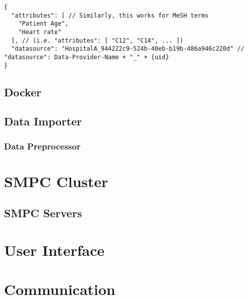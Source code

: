 {
\begin{verbatim}
{
  "attributes": [ // Similarly, this works for MeSH terms
    "Patient Age",
    "Heart rate"
  ], // (i.e. "attributes": [ "C12", "C14", ... ])
  "datasource": "HospitalA_944222c9-524b-40eb-b19b-486a946c220d" // "datasource": Data-Provider-Name + "_" + {uid}
}
\end{verbatim}
\label{sc:smpc-import-post}
}


\subsection{Docker}\label{ss:data-providers-docker}


\subsection{Data Importer}\label{ss:data-providers-importer}


\subsubsection{Data Preprocessor}\label{sss:data-providers-preprocessor}



\section{SMPC Cluster}\label{s:impl-smpc-cluster}

\subsection{SMPC Servers}\label{ss:smpc-cluster-servers}



\section{User Interface}\label{s:impl-ui}



\section{Communication}\label{s:impl-communication}


